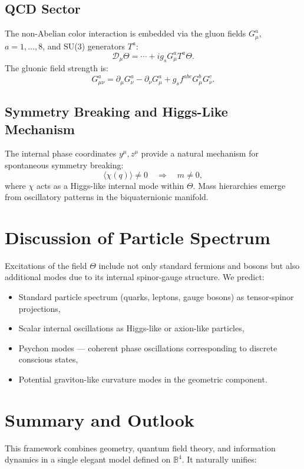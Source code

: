 \documentclass[12pt]{article}
\begin{document}
\subsection{QCD Sector}

The non-Abelian color interaction is embedded via the gluon fields \( G_\mu^a \), \( a=1,\dots,8 \), and SU(3) generators \( T^a \):
\[
\mathcal{D}_\mu \Theta = \cdots + i g_s G_\mu^a T^a \Theta.
\]
The gluonic field strength is:
\[
G_{\mu\nu}^a = \partial_\mu G_\nu^a - \partial_\nu G_\mu^a + g_s f^{abc} G_\mu^b G_\nu^c.
\]

\subsection{Symmetry Breaking and Higgs-Like Mechanism}

The internal phase coordinates \( y^\mu, z^\mu \) provide a natural mechanism for spontaneous symmetry breaking:
\[
\langle \chi(q) \rangle \neq 0 \quad \Rightarrow \quad m \neq 0,
\]
where \( \chi \) acts as a Higgs-like internal mode within \( \Theta \). Mass hierarchies emerge from oscillatory patterns in the biquaternionic manifold.

\section{Discussion of Particle Spectrum}

Excitations of the field \( \Theta \) include not only standard fermions and bosons but also additional modes due to its internal spinor-gauge structure. We predict:

\begin{itemize}
  \item Standard particle spectrum (quarks, leptons, gauge bosons) as tensor-spinor projections,
  \item Scalar internal oscillations as Higgs-like or axion-like particles,
  \item Psychon modes — coherent phase oscillations corresponding to discrete conscious states,
  \item Potential graviton-like curvature modes in the geometric component.
\end{itemize}

\section{Summary and Outlook}

This framework combines geometry, quantum field theory, and information dynamics in a single elegant model defined on \( \mathbb{B}^4 \). It naturally unifies:
\end{document}
